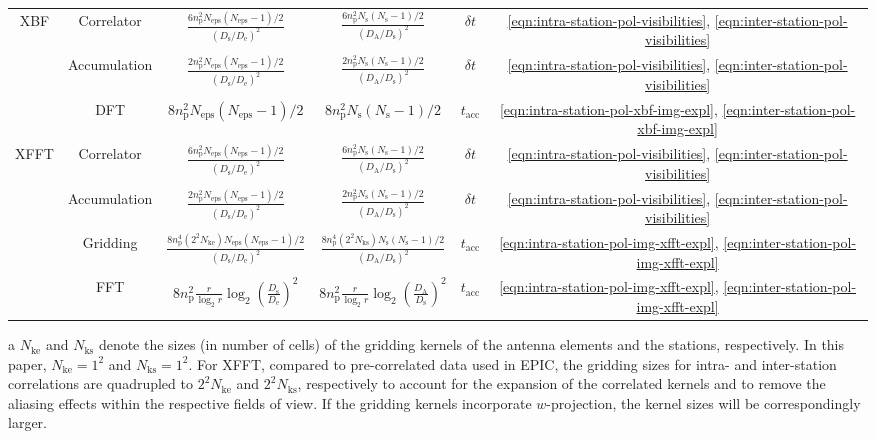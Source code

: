 \documentclass[
  journal=pasa,
  manuscript=article-type,
  year=2020,
  volume=37,
]{cup-journal}
\begin{document}
\begin{table}[htb!]
\begin{threeparttable}
\begin{tabular}{cccccc}
\midrule
XBF & Correlator & $\frac{6 n_\textrm{p}^2 N_\textrm{eps} (N_\textrm{eps}-1)/2}{(D_\textrm{s}/D_\textrm{e})^2}$ & $\frac{6 n_\textrm{p}^2 N_\textrm{s} (N_\textrm{s}-1)/2}{(D_\textrm{A}/D_\textrm{s})^2}$ & $\delta t$ & \ref{eqn:intra-station-pol-visibilities}, \ref{eqn:inter-station-pol-visibilities}  \\
& Accumulation & $\frac{2 n_\textrm{p}^2 N_\textrm{eps} (N_\textrm{eps}-1)/2}{(D_\textrm{s}/D_\textrm{e})^2}$ & $\frac{2 n_\textrm{p}^2  N_\textrm{s} (N_\textrm{s}-1)/2}{(D_\textrm{A}/D_\textrm{s})^2}$ & $\delta t$ & \ref{eqn:intra-station-pol-visibilities}, \ref{eqn:inter-station-pol-visibilities}  \\
& DFT & $8 n_\textrm{p}^2 N_\textrm{eps} (N_\textrm{eps}-1)/2$ & $8 n_\textrm{p}^2 N_\textrm{s} (N_\textrm{s}-1)/2$ & $t_\textrm{acc}$ & \ref{eqn:intra-station-pol-xbf-img-expl}, \ref{eqn:inter-station-pol-xbf-img-expl}  \\
\midrule
XFFT & Correlator & $\frac{6 n_\textrm{p}^2 N_\textrm{eps} (N_\textrm{eps}-1)/2}{(D_\textrm{s}/D_\textrm{e})^2}$ & $\frac{6 n_\textrm{p}^2 N_\textrm{s} (N_\textrm{s}-1)/2}{(D_\textrm{A}/D_\textrm{s})^2}$ & $\delta t$ & \ref{eqn:intra-station-pol-visibilities}, \ref{eqn:inter-station-pol-visibilities}  \\
& Accumulation & $\frac{2 n_\textrm{p}^2 N_\textrm{eps} (N_\textrm{eps}-1)/2}{(D_\textrm{s}/D_\textrm{e})^2}$ & $\frac{2 n_\textrm{p}^2 N_\textrm{s} (N_\textrm{s}-1)/2}{(D_\textrm{A}/D_\textrm{s})^2}$ & $\delta t$ & \ref{eqn:intra-station-pol-visibilities}, \ref{eqn:inter-station-pol-visibilities} \\
& Gridding\tnote{a} & $\frac{8 n_\textrm{p}^4 (2^2 N_\textrm{ke}) N_\textrm{eps} (N_\textrm{eps}-1)/2}{(D_\textrm{s}/D_\textrm{e})^2}$ & $\frac{8 n_\textrm{p}^4 (2^2 N_\textrm{ks}) N_\textrm{s} (N_\textrm{s}-1)/2}{(D_\textrm{A}/D_\textrm{s})^2}$ & $t_\textrm{acc}$ & \ref{eqn:intra-station-pol-img-xfft-expl}, \ref{eqn:inter-station-pol-img-xfft-expl} \\
& FFT\tnote{b} & $8 n_\textrm{p}^2 \frac{r}{\log_2 r} \log_2\left(\frac{D_\textrm{s}}{D_\textrm{e}}\right)^2$ & $8 n_\textrm{p}^2 \frac{r}{\log_2 r} \log_2\left(\frac{D_\textrm{A}}{D_\textrm{s}}\right)^2$ & $t_\textrm{acc}$ & \ref{eqn:intra-station-pol-img-xfft-expl}, \ref{eqn:inter-station-pol-img-xfft-expl} \\
\bottomrule
\end{tabular}
\begin{tablenotes}[hang]
\item[a]$N_\textrm{ke}$ and $N_\textrm{ks}$ denote the sizes (in number of cells) of the gridding kernels of the antenna elements and the stations, respectively. In this paper, $N_\textrm{ke}=1^2$ and $N_\textrm{ks}=1^2$. For XFFT, compared to pre-correlated data used in EPIC, the gridding sizes for intra- and inter-station correlations are quadrupled to $2^2 N_\textrm{ke}$ and $2^2 N_\textrm{ks}$, respectively to account for the expansion of the correlated kernels and to remove the aliasing effects within the respective fields of view. If the gridding kernels incorporate $w$-projection, the kernel sizes will be correspondingly larger.

\end{tablenotes}
\end{threeparttable}
\end{table}
\end{document}
